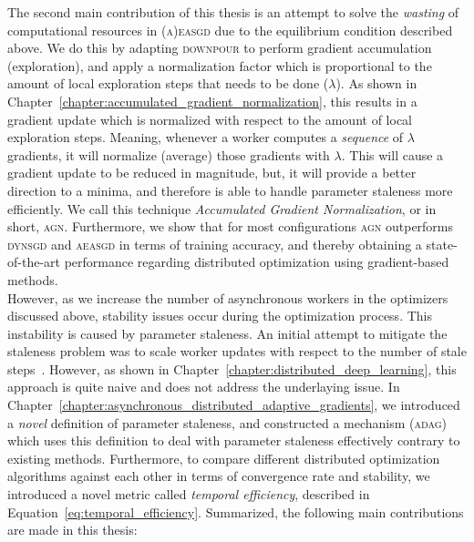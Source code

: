 The second main contribution of this thesis is an attempt to solve the \emph{wasting} of computational resources in \textsc{(a)easgd} due to the equilibrium condition described above. We do this by adapting \textsc{downpour} to perform gradient accumulation (exploration), and apply a normalization factor which is proportional to the amount of local exploration steps that needs to be done ($\lambda$). As shown in Chapter~\ref{chapter:accumulated_gradient_normalization}, this results in a gradient update which is normalized with respect to the amount of local exploration steps. Meaning, whenever a worker computes a \emph{sequence} of $\lambda$ gradients, it will normalize (average) those gradients with $\lambda$. This will cause a gradient update to be reduced in magnitude, but, it will provide a better direction to a minima, and therefore is able to handle parameter staleness more efficiently. We call this technique \emph{Accumulated Gradient Normalization}, or in short, \textsc{agn}. Furthermore, we show that for most configurations \textsc{agn} outperforms \textsc{dynsgd} and \textsc{aeasgd} in terms of training accuracy, and thereby obtaining a state-of-the-art performance regarding distributed optimization using gradient-based methods.\\

However, as we increase the number of asynchronous workers in the optimizers discussed above, stability issues occur during the optimization process. This instability is caused by parameter staleness. An initial attempt to mitigate the staleness problem was to scale worker updates with respect to the number of stale steps~\cite{jiang2017heterogeneity}. However, as shown in Chapter~\ref{chapter:distributed_deep_learning}, this approach is quite naive and does not address the underlaying issue. In Chapter~\ref{chapter:asynchronous_distributed_adaptive_gradients}, we introduced a \emph{novel} definition of parameter staleness, and constructed a mechanism (\textsc{adag}) which uses this definition to deal with parameter staleness effectively contrary to existing methods. Furthermore, to compare different distributed optimization algorithms against each other in terms of convergence rate and stability, we introduced a novel metric called \emph{temporal efficiency}, described in Equation~\ref{eq:temporal_efficiency}. Summarized, the following main contributions are made in this thesis:

